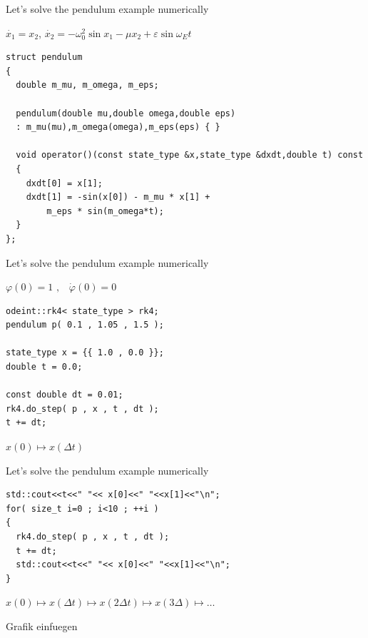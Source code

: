\begin{frame}[fragile]

\centerline{ \Large Let's solve the pendulum example numerically}

\vspace{2ex}

$\dot{x_1} = x_2$, $\dot{x_2} = - \omega_0^2 \sin x_1 - \mu x_2 + \varepsilon \sin \omega_E t$

\vspace{2ex}

\begin{lstlisting}
struct pendulum
{
  double m_mu, m_omega, m_eps;

  pendulum(double mu,double omega,double eps)
  : m_mu(mu),m_omega(omega),m_eps(eps) { }

  void operator()(const state_type &x,state_type &dxdt,double t) const
  {
    dxdt[0] = x[1];
    dxdt[1] = -sin(x[0]) - m_mu * x[1] +
        m_eps * sin(m_omega*t);
  }
};
\end{lstlisting}

\end{frame}

\begin{frame}[fragile]
 \centerline{ \Large Let's solve the pendulum example numerically}

\vspace{2ex}
$\varphi(0) = 1 \,\, \text{,} \quad \dot{\varphi}(0) = 0$
\vspace{2ex}

\begin{lstlisting}
odeint::rk4< state_type > rk4;
pendulum p( 0.1 , 1.05 , 1.5 );

state_type x = {{ 1.0 , 0.0 }};
double t = 0.0;

const double dt = 0.01;
rk4.do_step( p , x , t , dt );
t += dt;
\end{lstlisting}

\vspace{2ex}

$x(0) \mapsto x(\Delta t)$

\end{frame}

\begin{frame}[fragile]
 \centerline{ \Large Let's solve the pendulum example numerically}

\vspace{2ex}


\begin{lstlisting}
std::cout<<t<<" "<< x[0]<<" "<<x[1]<<"\n";
for( size_t i=0 ; i<10 ; ++i )
{
  rk4.do_step( p , x , t , dt );
  t += dt;
  std::cout<<t<<" "<< x[0]<<" "<<x[1]<<"\n";
}
\end{lstlisting}

\vspace{2ex}

$x(0) \mapsto x(\Delta t) \mapsto x(2\Delta t) \mapsto x(3\Delta) \mapsto \dots$

Grafik einfuegen

\end{frame}


